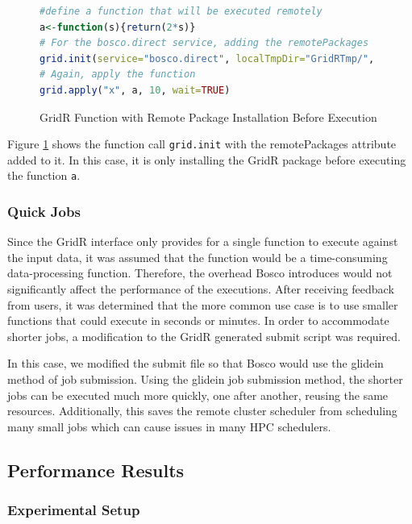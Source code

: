 \begin{figure}[h!t]
\begin{lstlisting}[language=R]
#define a function that will be executed remotely
a<-function(s){return(2*s)}
# For the bosco.direct service, adding the remotePackages
grid.init(service="bosco.direct", localTmpDir="GridRTmp/", remotePackages=c("GridR_0.9.8.tar.gz"))
# Again, apply the function
grid.apply("x", a, 10, wait=TRUE)
\end{lstlisting}
\caption{GridR Function with Remote Package Installation Before Execution}
\label{fig:gridrremotepackages}
\end{figure}

Figure \ref{fig:gridrremotepackages} shows the function call \texttt{grid.init} with the remotePackages attribute added to it.  In this case, it is only installing the GridR package before executing the function \texttt{a}.

\subsubsection{Quick Jobs}
Since the GridR interface only provides for a single function to execute against the input data, it was assumed that the function would be a time-consuming data-processing function.  Therefore, the overhead Bosco introduces would not significantly affect the performance of the executions.  After receiving feedback from users, it was determined that the more common use case is to use smaller functions that could execute in seconds or minutes.  In order to accommodate shorter jobs, a modification to the GridR generated submit script was required.

In this case, we modified the submit file so that Bosco would use the glidein method of job submission.  Using the glidein job submission method, the shorter jobs can be executed much more quickly, one after another, reusing the same resources.  Additionally, this saves the remote cluster scheduler from scheduling many small jobs which can cause issues in many HPC schedulers.


\subsection{Performance Results}

\subsubsection{Experimental Setup}  

